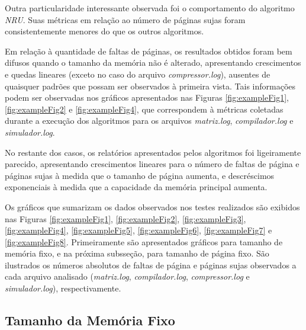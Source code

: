 \documentclass[a4paper, 12pt]{article}
\begin{document}
Outra particularidade interessante observada foi o comportamento do algoritmo \emph{NRU}. Suas métricas em relação ao número de páginas sujas foram consistentemente menores do que os outros algoritmos.

Em relação à quantidade de faltas de páginas, os resultados obtidos foram bem difusos quando o tamanho da memória não é alterado, apresentando crescimentos e quedas lineares (exceto no caso do arquivo \emph{compressor.log}), ausentes de quaisquer padrões que possam ser observados à primeira vista. Tais informações podem ser observadas nos gráficos apresentados nas Figuras \ref{fig:exampleFig1}, \ref{fig:exampleFig2} e \ref{fig:exampleFig4}, que correspondem à métricas coletadas durante a execução dos algoritmos para os arquivos \emph{matriz.log}, \emph{compilador.log} e \emph{simulador.log}.

No restante dos casos, os relatórios apresentados pelos algoritmos foi ligeiramente parecido, apresentando crescimentos lineares para o número de faltas de página e páginas sujas à medida que o tamanho de página aumenta, e descréscimos exponenciais à medida que a capacidade da memória principal aumenta.

Os gráficos que sumarizam os dados observados nos testes realizados são exibidos nas Figuras \ref{fig:exampleFig1}, \ref{fig:exampleFig2}, \ref{fig:exampleFig3}, \ref{fig:exampleFig4}, \ref{fig:exampleFig5}, \ref{fig:exampleFig6}, \ref{fig:exampleFig7} e \ref{fig:exampleFig8}. Primeiramente são apresentados gráficos para tamanho de memória fixo, e na próxima subsseção, para tamanho de página fixo. São ilustrados os números absolutos de faltas de página e páginas sujas observados a cada arquivo analisado (\emph{matriz.log}, \emph{compilador.log}, \emph{compressor.log} e \emph{simulador.log}), respectivamente.

\subsection{Tamanho da Memória Fixo}
\end{document}
